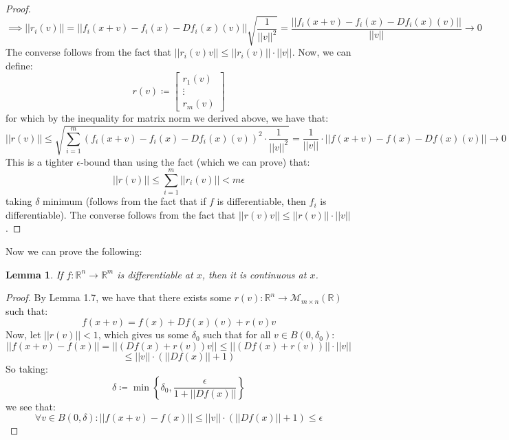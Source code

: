 \documentclass[10pt,letterpaper]{article} %
\newtheorem{lem}{Lemma}[section]
\begin{document}
\begin{proof}
\begin{equation*}
\implies ||r_i(v)|| = ||f_i(x+v) - f_i(x) - Df_i(x)(v)||\sqrt{\frac{1}{||v||^2}} = \frac{||f_i(x+v) - f_i(x) - Df_i(x)(v)||}{||v||} \xrightarrow{} 0
\end{equation*}
The converse follows from the fact that $||r_i(v)v|| \leqslant ||r_i(v)|| \cdot ||v||$. Now, we can define:
\begin{equation*}
r(v) \coloneq \begin{bmatrix}
r_1(v)\\
\vdots\\
r_m(v)
\end{bmatrix}
\end{equation*}
for which by the inequality for matrix norm we derived above, we have that:
\begin{equation*}
||r(v)|| \leqslant \sqrt{\sum_{i=1}^{m}(f_i(x+v) - f_i(x) - Df_i(x)(v))^2\cdot \frac{1}{||v||^2}} = \frac{1}{||v||}\cdot ||f(x+v) - f(x) - Df(x)(v)|| \xrightarrow{} 0 
\end{equation*}
This is a tighter $\epsilon$-bound than using the fact (which we can prove) that:
\begin{equation*}
||r(v)|| \leqslant \sum_{i=1}^{m}||r_i(v)|| < m\epsilon
\end{equation*}
taking $\delta$ minimum (follows from the fact that if $f$ is differentiable, then $f_i$ is differentiable). The converse follows from the fact that $||r(v)v|| \leqslant ||r(v)||\cdot ||v||$. 
\end{proof}

Now we can prove the following:
\begin{lem}
If $f: \mathbb{R}^n \xrightarrow{} \mathbb{R}^m$ is differentiable at $x$, then it is continuous at $x$.
\end{lem}
\begin{proof}
By Lemma 1.7, we have that there exists some $r(v): \mathbb{R}^n \xrightarrow{} \mathcal{M}_{m \times n}(\mathbb{R})$ such that:
\begin{equation*}
f(x+v) = f(x) + Df(x)(v) + r(v)v
\end{equation*}
Now, let $||r(v)|| < 1$, which gives us some $\delta_0$ such that for all $v \in B(0, \delta_0)$:
\begin{equation*}
||f(x+v) - f(x)|| = ||(Df(x) + r(v))v|| \leqslant ||(Df(x) + r(v))|| \cdot ||v||
\end{equation*}
\begin{equation*}
\leqslant ||v|| \cdot (||Df(x)|| + 1)
\end{equation*}
So taking:
\begin{equation*}
\delta \coloneq \min\left\{\delta_0, \frac{\epsilon}{1 + ||Df(x)||}\right\}
\end{equation*}
we see that:
\begin{equation*}
\forall v \in B(0, \delta): ||f(x+v) - f(x)|| \leqslant ||v|| \cdot (||Df(x)|| + 1) \leqslant \epsilon
\end{equation*}
\end{proof}
\end{document}

